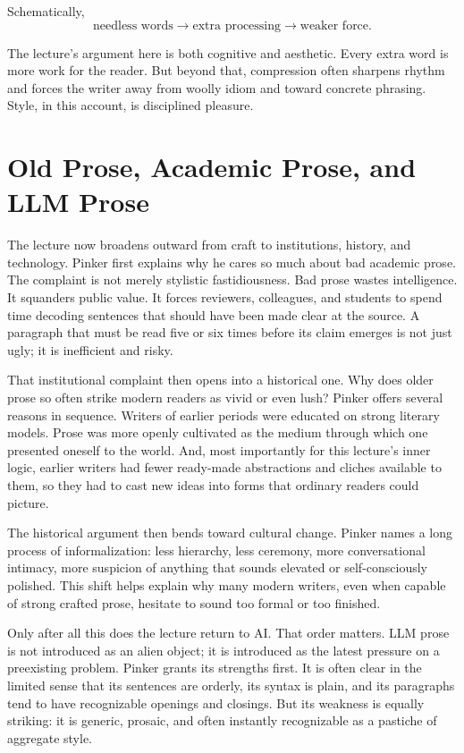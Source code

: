 Schematically,
\begin{equation}
\text{needless words} \to \text{extra processing} \to \text{weaker force}.
\end{equation}

The lecture's argument here is both cognitive and aesthetic. Every extra word is more work for the reader. But beyond that, compression often sharpens rhythm and forces the writer away from woolly idiom and toward concrete phrasing. Style, in this account, is disciplined pleasure.

\section{Old Prose, Academic Prose, and LLM Prose}

The lecture now broadens outward from craft to institutions, history, and technology. Pinker first explains why he cares so much about bad academic prose. The complaint is not merely stylistic fastidiousness. Bad prose wastes intelligence. It squanders public value. It forces reviewers, colleagues, and students to spend time decoding sentences that should have been made clear at the source. A paragraph that must be read five or six times before its claim emerges is not just ugly; it is inefficient and risky.

That institutional complaint then opens into a historical one. Why does older prose so often strike modern readers as vivid or even lush? Pinker offers several reasons in sequence. Writers of earlier periods were educated on strong literary models. Prose was more openly cultivated as the medium through which one presented oneself to the world. And, most importantly for this lecture's inner logic, earlier writers had fewer ready-made abstractions and cliches available to them, so they had to cast new ideas into forms that ordinary readers could picture.

The historical argument then bends toward cultural change. Pinker names a long process of informalization: less hierarchy, less ceremony, more conversational intimacy, more suspicion of anything that sounds elevated or self-consciously polished. This shift helps explain why many modern writers, even when capable of strong crafted prose, hesitate to sound too formal or too finished.

Only after all this does the lecture return to AI. That order matters. LLM prose is not introduced as an alien object; it is introduced as the latest pressure on a preexisting problem. Pinker grants its strengths first. It is often clear in the limited sense that its sentences are orderly, its syntax is plain, and its paragraphs tend to have recognizable openings and closings. But its weakness is equally striking: it is generic, prosaic, and often instantly recognizable as a pastiche of aggregate style.

